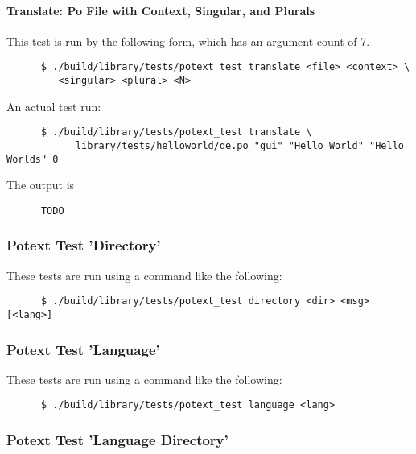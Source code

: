 \paragraph{Translate: Po File with Context, Singular, and Plurals}
\label{paragraph:potext_test_translate_po_context_singular_plural}

   This test is run by the following form, which has an argument count
   of 7.

   \begin{verbatim}
      $ ./build/library/tests/potext_test translate <file> <context> \
         <singular> <plural> <N>
   \end{verbatim}

   An actual test run:

   \begin{verbatim}
      $ ./build/library/tests/potext_test translate \
            library/tests/helloworld/de.po "gui" "Hello World" "Hello Worlds" 0
   \end{verbatim}

   The output is

   \begin{verbatim}
      TODO
   \end{verbatim}

\subsubsection{Potext Test 'Directory'}
\label{subsubsec:potext_test_directory}

   These tests are run using a command like the following:

   \begin{verbatim}
      $ ./build/library/tests/potext_test directory <dir> <msg> [<lang>]
   \end{verbatim}

\subsubsection{Potext Test 'Language'}
\label{subsubsec:potext_test_language}

   These tests are run using a command like the following:

   \begin{verbatim}
      $ ./build/library/tests/potext_test language <lang>
   \end{verbatim}

\subsubsection{Potext Test 'Language Directory'}
\label{subsubsec:potext_test_language_directory}

